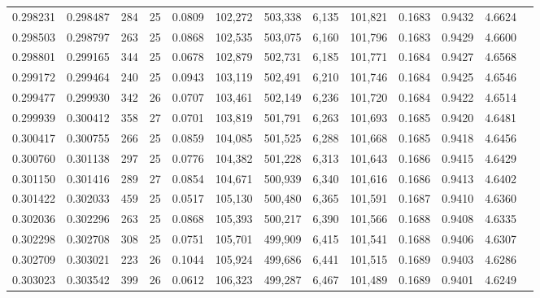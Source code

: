 \begin{tabular}{rrrrrrrrrrrrr}
0.298231 & 0.298487 & 284 &  25 &                                     0.0809 & 102,272 & 503,338 &   6,135 & 101,821 & 0.1683 & 0.9432 & 4.6624 \\
0.298503 & 0.298797 & 263 &  25 &                                     0.0868 & 102,535 & 503,075 &   6,160 & 101,796 & 0.1683 & 0.9429 & 4.6600 \\
0.298801 & 0.299165 & 344 &  25 &                                     0.0678 & 102,879 & 502,731 &   6,185 & 101,771 & 0.1684 & 0.9427 & 4.6568 \\
0.299172 & 0.299464 & 240 &  25 &                                     0.0943 & 103,119 & 502,491 &   6,210 & 101,746 & 0.1684 & 0.9425 & 4.6546 \\
0.299477 & 0.299930 & 342 &  26 &                                     0.0707 & 103,461 & 502,149 &   6,236 & 101,720 & 0.1684 & 0.9422 & 4.6514 \\
0.299939 & 0.300412 & 358 &  27 &                                     0.0701 & 103,819 & 501,791 &   6,263 & 101,693 & 0.1685 & 0.9420 & 4.6481 \\
0.300417 & 0.300755 & 266 &  25 &                                     0.0859 & 104,085 & 501,525 &   6,288 & 101,668 & 0.1685 & 0.9418 & 4.6456 \\
0.300760 & 0.301138 & 297 &  25 &                                     0.0776 & 104,382 & 501,228 &   6,313 & 101,643 & 0.1686 & 0.9415 & 4.6429 \\
0.301150 & 0.301416 & 289 &  27 &                                     0.0854 & 104,671 & 500,939 &   6,340 & 101,616 & 0.1686 & 0.9413 & 4.6402 \\
0.301422 & 0.302033 & 459 &  25 &                                     0.0517 & 105,130 & 500,480 &   6,365 & 101,591 & 0.1687 & 0.9410 & 4.6360 \\
0.302036 & 0.302296 & 263 &  25 &                                     0.0868 & 105,393 & 500,217 &   6,390 & 101,566 & 0.1688 & 0.9408 & 4.6335 \\
0.302298 & 0.302708 & 308 &  25 &                                     0.0751 & 105,701 & 499,909 &   6,415 & 101,541 & 0.1688 & 0.9406 & 4.6307 \\
0.302709 & 0.303021 & 223 &  26 &                                     0.1044 & 105,924 & 499,686 &   6,441 & 101,515 & 0.1689 & 0.9403 & 4.6286 \\
0.303023 & 0.303542 & 399 &  26 &                                     0.0612 & 106,323 & 499,287 &   6,467 & 101,489 & 0.1689 & 0.9401 & 4.6249 \\

\end{tabular}
